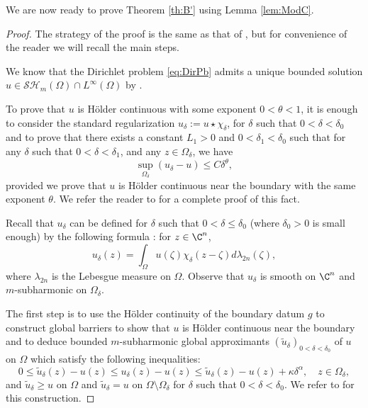 We are now ready to prove Theorem \ref{th:B'} using Lemma \ref{lem:ModC}.

\begin{proof} The strategy of the proof is the same as that of \cite[Th.\,B]{BZ20}, but for convenience of the reader we will recall the main steps.

We know that the Dirichlet problem \eqref{eq:DirPb} admits a unique bounded solution $u \in \mathcal{SH}_m (\Omega) \cap L^{\infty} (\Omega)$ by \cite{N13}.

To prove that $u$ is Hölder continuous with some exponent $0 < \theta < 1$, it is enough to consider the standard regularization $u_\delta := u \star \chi_\delta$, for $\delta$ such that $0 < \delta < \delta_0$ and to prove that there exists a constant $L_1 > 0$ and $0< \delta_1 < \delta_0$ such that for any $\delta$ such that $0 < \delta < \delta_1$, and any $z \in \Omega_\delta$, we have
\begin{equation} \label{eq:Holdercontinous}
\sup_{\Omega_\delta} (u_\delta - u) \leq C \delta^{\theta},
\end{equation}
provided we prove that $u$ is Hölder continuous near the boundary with the same exponent $\theta$. We refer the reader to \cite{Ze20} for a complete proof of this fact.

Recall that $u_\delta$ can be defined for $\delta$ such that $0 < \delta \leq \delta_0$ (where $\delta_0 >0$ is small enough) by the following formula : for $z \in \C^n$,
\[
u_\delta (z) = \int_{\Omega} u (\zeta) \chi_\delta (z-\zeta) d \lambda_{2 n} (\zeta),
\]
where $\lambda_{2 n}$ is the Lebesgue measure on $\Omega$.
Observe that $u_\delta $ is smooth on $\C^n$ and $m$-subharmonic on $\Omega_\delta$.

The first step is to use the Hölder continuity of the boundary datum $g$ to construct global barriers to show that $u$ is Hölder continuous near the boundary and to deduce bounded $m$-subharmonic global approximants $(\tilde u_\delta)_{0 < \delta < \delta_0}$ of $u$ on $\Omega$ which satisfy the following inequalities:
\begin{equation} \label{eq:bestapproximant}
0 \leq \tilde{u}_{\delta}(z) - u (z) \leq u_\delta (z) - u (z) \leq \tilde{u}_{\delta}(z) - u (z) + \kappa \delta^\alpha, \quad z\in \Omega_{\delta},
\end{equation}
and $ \tilde{u}_{\delta} \geq u$ on $ \Omega$ and $\tilde{u}_{\delta} = u$ on $\Omega \setminus \Omega_\delta$ for $\delta$ such that $0 < \delta < \delta_0$.
We refer to \cite{BZ20} for this construction.


\end{proof}
